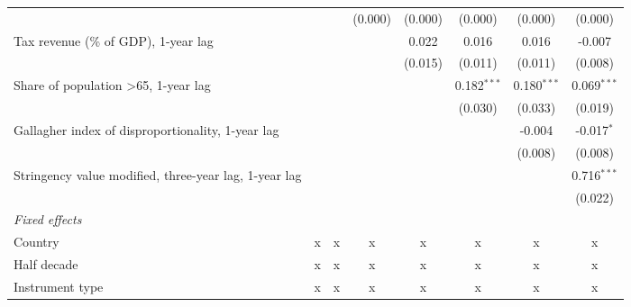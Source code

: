 \begin{tabular}{lccccccc}
                                                                            &                &                & (0.000)        & (0.000)       & (0.000)       & (0.000)       & (0.000)\\   
   Tax revenue (\% of GDP), 1-year lag                                      &                &                &                & 0.022         & 0.016         & 0.016         & -0.007\\   
                                                                            &                &                &                & (0.015)       & (0.011)       & (0.011)       & (0.008)\\   
   Share of population >65, 1-year lag                                      &                &                &                &               & 0.182$^{***}$ & 0.180$^{***}$ & 0.069$^{***}$\\   
                                                                            &                &                &                &               & (0.030)       & (0.033)       & (0.019)\\   
   Gallagher index of disproportionality, 1-year lag                        &                &                &                &               &               & -0.004        & -0.017$^{*}$\\   
                                                                            &                &                &                &               &               & (0.008)       & (0.008)\\   
   Stringency value modified, three-year lag, 1-year lag                    &                &                &                &               &               &               & 0.716$^{***}$\\   
                                                                            &                &                &                &               &               &               & (0.022)\\   
   \emph{Fixed effects}\\
   Country                                                                  & x              & x              & x              & x             & x             & x             & x\\  
   Half decade                                                              & x              & x              & x              & x             & x             & x             & x\\  
   Instrument type                                                          & x              & x              & x              & x             & x             & x             & x\\  

\end{tabular}
